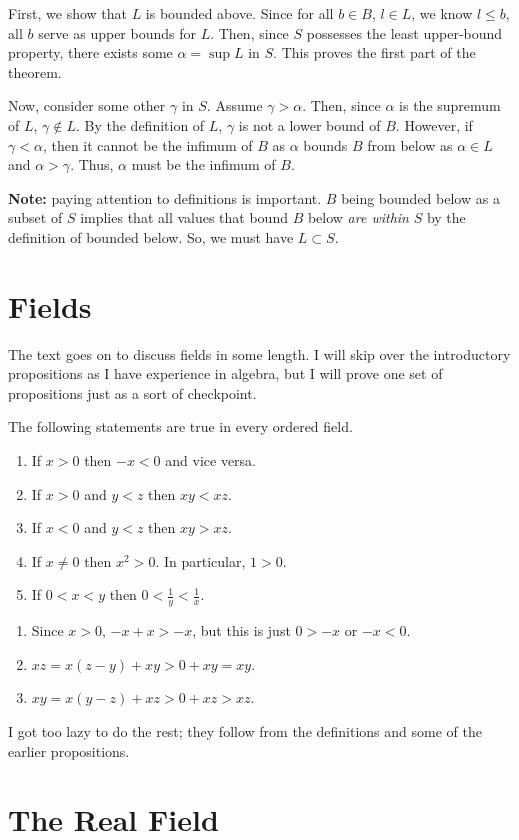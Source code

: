 \documentclass[a4paper,10pt]{article}
\theoremstyle{plain}
\begin{document}
\begin{myproof}
    First, we show that \(L\) is bounded above. Since for all \(b \in B\), 
    \(l \in L\), we know \(l \le b\), all \(b\) serve as upper bounds for
    \(L\). Then, since \(S\) possesses the least upper-bound property, there
    exists some \(\alpha = \sup L\) in \(S\). This proves the first part of 
    the theorem.

    Now, consider some other \(\gamma\) in \(S\). Assume \(\gamma > \alpha\). Then, 
    since \(\alpha\) is the supremum of \(L\), \(\gamma \notin L\). By
    the definition of \(L\), \(\gamma\) is not a lower bound of \(B\). However, 
    if \(\gamma < \alpha\), then it cannot be the infimum of \(B\) as 
    \(\alpha\) bounds \(B\) from below as \(\alpha \in L\) and \(\alpha > \gamma\).
    Thus, \(\alpha\) must be the infimum of \(B\). 
\end{myproof}
\textbf{Note:} paying attention to definitions is important. \(B\) being bounded below
as a subset of \(S\) implies that all values that bound \(B\) below \textit{are within}
\(S\) by the definition of bounded below. So, we must have \(L \subset S\). 

\section{Fields}
The text goes on to discuss fields in some length. I will skip over the introductory propositions
as I have experience in algebra, but I will prove one set of propositions just as a sort of
checkpoint. 

\begin{myproposition}{}{}
    The following statements are true in every ordered field. 
    \begin{enumerate}
        \item If $x > 0$ then $-x < 0$ and vice versa. 
        \item If $x > 0 $ and $y < z$ then  $xy < xz$.
        \item If $x < 0$ and $y < z$ then $xy > xz$.
        \item If  $x \neq 0$ then  $x^2 > 0$. In particular, $1 > 0$. 
        \item If $0 < x < y$ then $0 < \frac{1}{y} < \frac{1}{x}$. 
    \end{enumerate}
\end{myproposition}

\begin{myproof}
    \begin{enumerate}
        \item Since $x > 0$, $-x + x > -x$, but this is just $0 > -x$ or $-x < 0$.
        \item $xz = x(z-y) + xy > 0 + xy = xy$. 
        \item $xy = x(y-z) + xz > 0 + xz > xz$. 
    \end{enumerate}
\end{myproof}

I got too lazy to do the rest; they follow from the definitions and some of the earlier 
propositions. 

\section{The Real Field}
\end{document}
